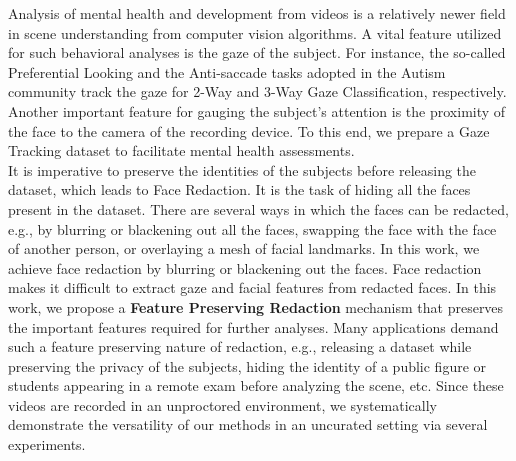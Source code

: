 \begin{Abstract}
Analysis of mental health and development from videos is a relatively newer field in scene understanding from computer vision algorithms. A vital feature utilized for such behavioral analyses is the gaze of the subject. For instance, the so-called Preferential Looking and the Anti-saccade tasks adopted in the Autism community track the gaze for 2-Way and 3-Way Gaze Classification, respectively. Another important feature for gauging the subject's attention is the proximity of the face to the camera of the recording device. To this end, we prepare a Gaze Tracking dataset to facilitate mental health assessments.\\

It is imperative to preserve the identities of the subjects before releasing the dataset, which leads to Face Redaction. It is the task of hiding all the faces present in the dataset. There are several ways in which the faces can be redacted, e.g., by blurring or blackening out all the faces, swapping the face with the face of another person, or overlaying a mesh of facial landmarks. In this work, we achieve face redaction by blurring or blackening out the faces. Face redaction makes it difficult to extract gaze and facial features from redacted faces. In this work, we propose a \textbf{Feature Preserving Redaction} mechanism that preserves the important features required for further analyses. Many applications demand such a feature preserving nature of redaction, e.g., releasing a dataset while preserving the privacy of the subjects, hiding the identity of a public figure or students appearing in a remote exam before analyzing the scene, etc. Since these videos are recorded in an unproctored environment, we systematically demonstrate the versatility of our methods in an uncurated setting via several experiments.


%
%
%
%
%
\end{Abstract}

